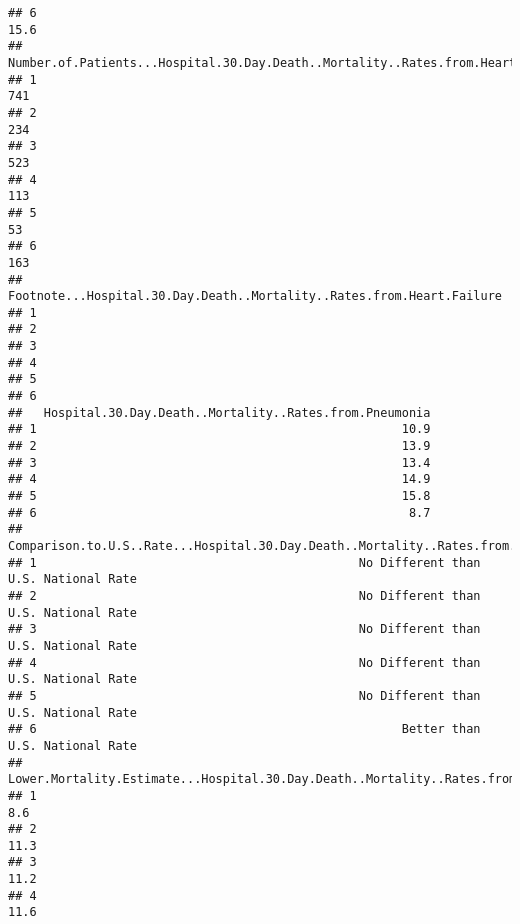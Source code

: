 \documentclass[]{article}
\begin{document}
\begin{verbatim}
## 6                                                                                  15.6
##   Number.of.Patients...Hospital.30.Day.Death..Mortality..Rates.from.Heart.Failure
## 1                                                                             741
## 2                                                                             234
## 3                                                                             523
## 4                                                                             113
## 5                                                                              53
## 6                                                                             163
##   Footnote...Hospital.30.Day.Death..Mortality..Rates.from.Heart.Failure
## 1                                                                      
## 2                                                                      
## 3                                                                      
## 4                                                                      
## 5                                                                      
## 6                                                                      
##   Hospital.30.Day.Death..Mortality..Rates.from.Pneumonia
## 1                                                   10.9
## 2                                                   13.9
## 3                                                   13.4
## 4                                                   14.9
## 5                                                   15.8
## 6                                                    8.7
##   Comparison.to.U.S..Rate...Hospital.30.Day.Death..Mortality..Rates.from.Pneumonia
## 1                                             No Different than U.S. National Rate
## 2                                             No Different than U.S. National Rate
## 3                                             No Different than U.S. National Rate
## 4                                             No Different than U.S. National Rate
## 5                                             No Different than U.S. National Rate
## 6                                                   Better than U.S. National Rate
##   Lower.Mortality.Estimate...Hospital.30.Day.Death..Mortality..Rates.from.Pneumonia
## 1                                                                               8.6
## 2                                                                              11.3
## 3                                                                              11.2
## 4                                                                              11.6

\end{verbatim}
\end{document}
